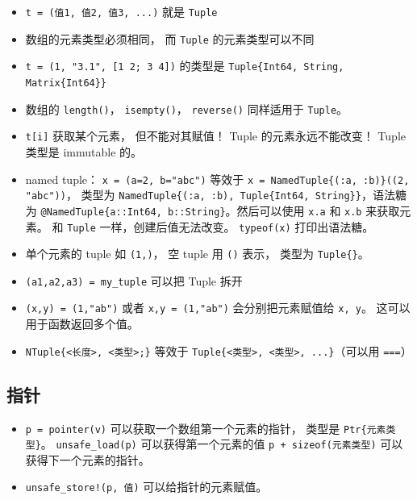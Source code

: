 \begin{itemize}
\item \verb`t = (值1, 值2, 值3, ...)` 就是 \verb`Tuple`
\item 数组的元素类型必须相同， 而 \verb`Tuple` 的元素类型可以不同
\item \verb`t = (1, "3.1", [1 2; 3 4])` 的类型是 \verb`Tuple{Int64, String, Matrix{Int64}}`
\item 数组的 \verb`length()`， \verb`isempty()`， \verb`reverse()` 同样适用于 \verb`Tuple`。
\item \verb`t[i]` 获取某个元素， 但不能对其赋值！ Tuple 的元素永远不能改变！ Tuple 类型是 immutable 的。
\item named tuple： \verb`x = (a=2, b="abc")` 等效于 \verb`x = NamedTuple{(:a, :b)}((2, "abc"))`， 类型为 \verb`NamedTuple{(:a, :b), Tuple{Int64, String}}`，语法糖为 \verb`@NamedTuple{a::Int64, b::String}`。然后可以使用 \verb`x.a` 和 \verb`x.b` 来获取元素。 和 \verb`Tuple` 一样，创建后值无法改变。 \verb`typeof(x)` 打印出语法糖。
\item 单个元素的 tuple 如 \verb`(1,)`， 空 tuple 用 \verb`()` 表示， 类型为 \verb`Tuple{}`。
\item \verb`(a1,a2,a3) = my_tuple` 可以把 Tuple 拆开
\item \verb`(x,y) = (1,"ab")` 或者 \verb`x,y = (1,"ab")` 会分别把元素赋值给 \verb`x, y`。 这可以用于函数返回多个值。
\item \verb`NTuple{<长度>, <类型>;}` 等效于 \verb`Tuple{<类型>, <类型>, ...}`（可以用 \verb`===`）
\end{itemize}

\subsection{指针}
\begin{itemize}
\item \verb`p = pointer(v)` 可以获取一个数组第一个元素的指针， 类型是 \verb`Ptr{元素类型}`。 \verb`unsafe_load(p)` 可以获得第一个元素的值 \verb`p + sizeof(元素类型)` 可以获得下一个元素的指针。
\item \verb`unsafe_store!(p, 值)` 可以给指针的元素赋值。
\end{itemize}

